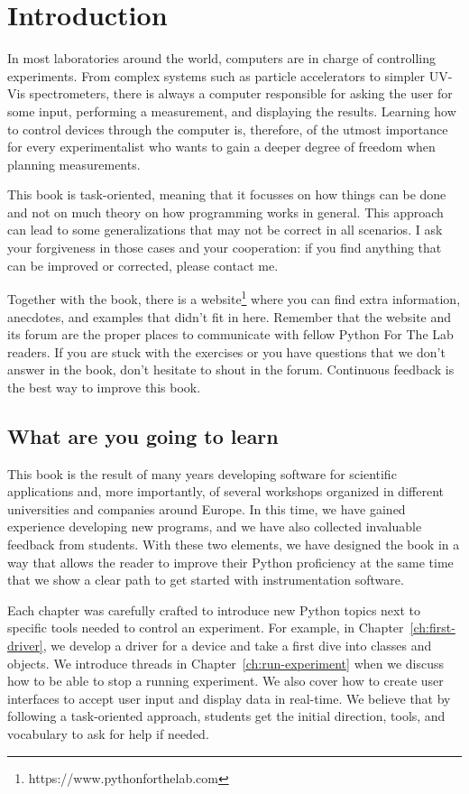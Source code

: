 \chapter{Introduction}\label{ch:introduction}
In most laboratories around the world, computers are in charge of controlling experiments. From complex systems such as particle accelerators to simpler UV-Vis spectrometers, there is always a computer responsible for asking the user for some input, performing a measurement, and displaying the results. Learning how to control devices through the computer is, therefore, of the utmost importance for every experimentalist who wants to gain a deeper degree of freedom when planning measurements.

This book is task-oriented, meaning that it focusses on how things can be done and not on much theory on how programming works in general. This approach can lead to some generalizations that may not be correct in all scenarios. I ask your forgiveness in those cases and your cooperation: if you find anything that can be improved or corrected, please contact me.

Together with the book, there is a website\footnote{https://www.pythonforthelab.com} where you can find extra information, anecdotes, and examples that didn't fit in here. Remember that the website and its forum are the proper places to communicate with fellow Python For The Lab readers. If you are stuck with the exercises or you have questions that we don't answer in the book, don't hesitate to shout in the forum. Continuous feedback is the best way to improve this book.

\section{What are you going to learn}
This book is the result of many years developing software for scientific applications and, more importantly, of several workshops organized in different universities and companies around Europe. In this time, we have gained experience developing new programs, and we have also collected invaluable feedback from students. With these two elements, we have designed the book in a way that allows the reader to improve their Python proficiency at the same time that we show a clear path to get started with instrumentation software.

Each chapter was carefully crafted to introduce new Python topics next to specific tools needed to control an experiment. For example, in Chapter~\ref{ch:first-driver}, we develop a driver for a device and take a first dive into classes and objects. We introduce threads in Chapter~\ref{ch:run-experiment} when we discuss how to be able to stop a running experiment. We also cover how to create user interfaces to accept user input and display data in real-time. We believe that by following a task-oriented approach, students get the initial direction, tools, and vocabulary to ask for help if needed.


